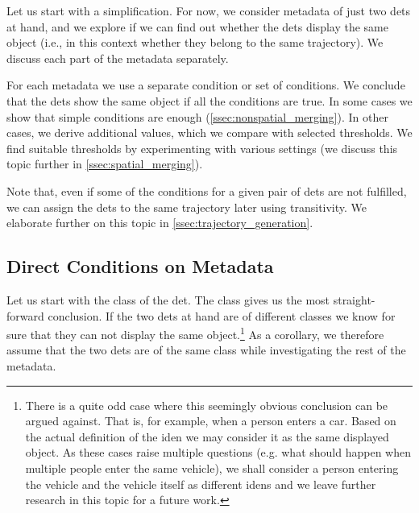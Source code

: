 Let us start with a simplification. For now, we consider metadata of just two \glspl{det} at hand, and we explore if we can find out whether the \glspl{det} display the same object (i.e., in this context whether they belong to the same trajectory). We discuss each part of the metadata separately.

For each metadata we use a separate condition or set of conditions. We conclude that the \glspl{det} show the same object if all the conditions are true. In some cases we show that simple conditions are enough (\autoref{ssec:nonspatial_merging}). In other cases, we derive additional values, which we compare with selected thresholds. We find suitable thresholds by experimenting with various settings (we discuss this topic further in \autoref{ssec:spatial_merging}).

Note that, even if some of the conditions for a given pair of \glspl{det} are not fulfilled, we can assign the \glspl{det} to the same trajectory later using transitivity. We elaborate further on this topic in \autoref{ssec:trajectory_generation}.

\subsection{Direct Conditions on Metadata}

\label{ssec:nonspatial_merging}

Let us start with the class of the \gls{det}. The class
gives us the most straight-forward conclusion.
If the two \glspl{det} at hand are of different classes we know for sure
that they can not display the same
object.\footnote{There is a quite
odd case where this seemingly obvious conclusion can be argued against. That
is, for example, when a person enters a car. Based on the actual definition of
the \gls{iden} we may consider it as the same displayed object. As these cases
raise multiple questions (e.g. what should happen when multiple people enter the same vehicle), we shall consider a person entering the vehicle and the vehicle itself as different
\glspl{iden} and we leave further research in this topic for a
future work.} As a corollary, we therefore assume that the two \glspl{det} are
of the same class while investigating the rest of the metadata.

